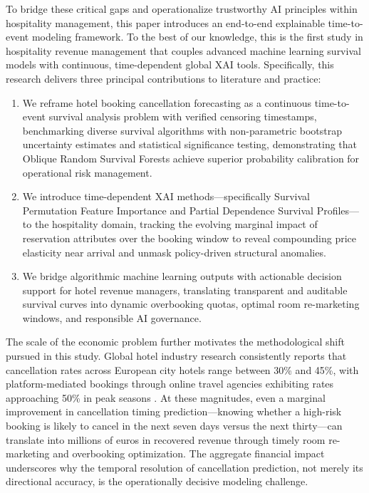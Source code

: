 \documentclass[pdflatex,iicol,sn-mathphys-ay]{sn-jnl}
\theoremstyle{thmstyleone}%
\theoremstyle{thmstyletwo}%
\theoremstyle{thmstylethree}%
\begin{document}
To bridge these critical gaps and operationalize trustworthy AI principles within hospitality management, this paper introduces an end-to-end explainable time-to-event modeling framework. To the best of our knowledge, this is the first study in hospitality revenue management that couples advanced machine learning survival models with continuous, time-dependent global XAI tools. Specifically, this research delivers three principal contributions to literature and practice:
\begin{enumerate}
\item We reframe hotel booking cancellation forecasting as a continuous time-to-event survival analysis problem with verified censoring timestamps, benchmarking diverse survival algorithms with non-parametric bootstrap uncertainty estimates and statistical significance testing, demonstrating that Oblique Random Survival Forests achieve superior probability calibration for operational risk management.
\item We introduce time-dependent XAI methods—specifically Survival Permutation Feature Importance and Partial Dependence Survival Profiles—to the hospitality domain, tracking the evolving marginal impact of reservation attributes over the booking window to reveal compounding price elasticity near arrival and unmask policy-driven structural anomalies.
\item We bridge algorithmic machine learning outputs with actionable decision support for hotel revenue managers, translating transparent and auditable survival curves into dynamic overbooking quotas, optimal room re-marketing windows, and responsible AI governance.
\end{enumerate}

The scale of the economic problem further motivates the methodological shift pursued in this study. Global hotel industry research consistently reports that cancellation rates across European city hotels range between 30\% and 45\%, with platform-mediated bookings through online travel agencies exhibiting rates approaching 50\% in peak seasons \citep{antonio2019big, falk2018modelling}. At these magnitudes, even a marginal improvement in cancellation timing prediction—knowing whether a high-risk booking is likely to cancel in the next seven days versus the next thirty—can translate into millions of euros in recovered revenue through timely room re-marketing and overbooking optimization. The aggregate financial impact underscores why the temporal resolution of cancellation prediction, not merely its directional accuracy, is the operationally decisive modeling challenge.
\end{document}
